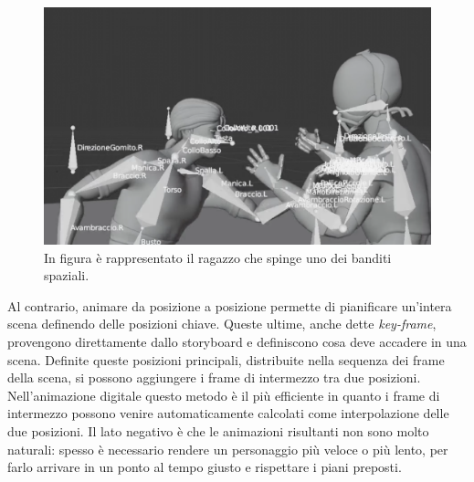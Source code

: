 \begin{figure}
\centering
\includegraphics[width=\textwidth]{Figures/screen5}
\decoRule
\caption[Scena esempio 4]{In figura è rappresentato il ragazzo che spinge uno dei banditi spaziali.}
\label{fig:eg4}
\end{figure}
Al contrario, animare da posizione a posizione permette di pianificare un'intera scena definendo delle posizioni chiave.
Queste ultime, anche dette \emph{key-frame}, provengono direttamente dallo storyboard e definiscono cosa deve accadere in una scena.
Definite queste posizioni principali, distribuite nella sequenza dei frame della scena, si possono aggiungere i frame di intermezzo tra due posizioni.
Nell'animazione digitale questo metodo è il più efficiente in quanto i frame di intermezzo possono venire automaticamente calcolati come interpolazione delle due posizioni.
Il lato negativo è che le animazioni risultanti non sono molto naturali: spesso è necessario rendere un personaggio più veloce o più lento, per farlo arrivare in un ponto al tempo giusto e rispettare i piani preposti.

